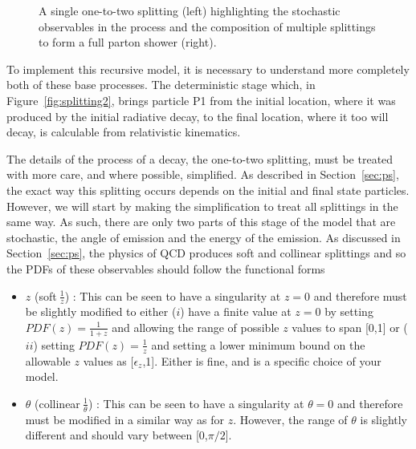 \documentclass[UKenglish,texlive=2016]{\ATLASLATEXPATH atlasdoc}
\begin{document}
\begin{figure}
\centering
{}
\caption{A single one-to-two splitting (left) highlighting the stochastic observables in the process and the composition of multiple splittings to form a full parton shower (right).}
\label{fig:splitting1}
\end{figure}

To implement this recursive model, it is necessary to understand more completely both of these base processes.  The deterministic stage which, in Figure~\ref{fig:splitting2}, brings particle P1 from the initial location, where it was produced by the initial radiative decay, to the final location, where it too will decay, is calculable from relativistic kinematics.  

The details of the process of a decay, the one-to-two splitting, must be treated with more care, and where possible, simplified.  As described in Section~\ref{sec:ps}, the exact way this splitting occurs depends on the initial and final state particles.  However, we will start by making the simplification to treat all splittings in the same way.  As such, there are only two parts of this stage of the model that are stochastic, the angle of emission and the energy of the emission.  As discussed in Section~\ref{sec:ps}, the physics of QCD produces soft and collinear splittings and so the PDFs of these observables should follow the functional forms

\begin{itemize}
\item $z$ (soft$~\frac{1}{z}$) : This can be seen to have a singularity at $z=0$ and therefore must be slightly modified to either ($i$) have a finite value at $z=0$ by setting $PDF(z)=\frac{1}{1+z}$ and allowing the range of possible $z$ values to span [0,1] or ($ii$) setting $PDF(z)=\frac{1}{z}$ and setting a lower minimum bound on the allowable $z$ values as [$\epsilon_z$,1].  Either is fine, and is a specific choice of your model.
\item $\theta$ (collinear$~\frac{1}{\theta}$) : This can be seen to have a singularity at $\theta=0$ and therefore must be modified in a similar way as for $z$.  However, the range of $\theta$ is slightly different and should vary between [0,$\pi/2$].
\end{itemize}
\end{document}
